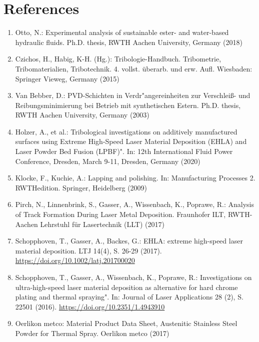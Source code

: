 \documentclass[10pt]{article}
\begin{document}
\section*{References}
\begin{enumerate}
  \item Otto, N.: Experimental analysis of sustainable ester- and water-based hydraulic fluids. Ph.D. thesis, RWTH Aachen University, Germany (2018)

  \item Czichos, H., Habig, K-H. (Hg.): Tribologie-Handbuch. Tribometrie, Tribomaterialien, Tribotechnik. 4. vollst. überarb. und erw. Aufl. Wiesbaden: Springer Vieweg, Germany (2015)

  \item Van Bebber, D.: PVD-Schichten in Verdr"angereinheiten zur Verschleiß- und Reibungsminimierung bei Betrieb mit synthetischen Estern. Ph.D. thesis, RWTH Aachen University, Germany (2003)

  \item Holzer, A., et al.: Tribological investigations on additively manufactured surfaces using Extreme High-Speed Laser Material Deposition (EHLA) and Laser Powder Bed Fusion (LPBF)". In: 12th International Fluid Power Conference, Dresden, March 9-11, Dresden, Germany (2020)

  \item Klocke, F., Kuchie, A.: Lapping and polishing. In: Manufacturing Processes 2. RWTHedition. Springer, Heidelberg (2009)

  \item Pirch, N., Linnenbrink, S., Gasser, A., Wissenbach, K., Poprawe, R.: Analysis of Track Formation During Laser Metal Deposition. Fraunhofer ILT, RWTH-Aachen Lehrstuhl für Lasertechnik (LLT) (2017)

  \item Schopphoven, T., Gasser, A., Backes, G.: EHLA: extreme high-speed laser material deposition. LTJ 14(4), S. 26-29 (2017). \href{https://doi.org/10.1002/latj.201700020}{https://doi.org/10.1002/latj.201700020}

  \item Schopphoven, T., Gasser, A., Wissenbach, K., Poprawe, R.: Investigations on ultra-high-speed laser material deposition as alternative for hard chrome plating and thermal spraying". In: Journal of Laser Applications 28 (2), S. 22501 (2016). \href{https://doi.org/10.2351/1.4943910}{https://doi.org/10.2351/1.4943910}

  \item Oerlikon metco: Material Product Data Sheet, Austenitic Stainless Steel Powder for Thermal Spray. Oerlikon metco (2017)


\end{enumerate}
\end{document}
